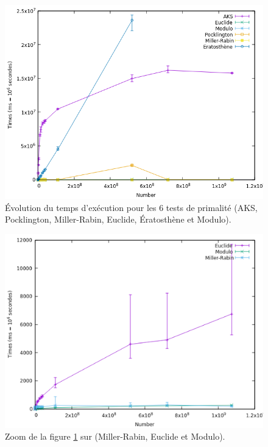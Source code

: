 \begin{frame}
\begin{figure}[!ht]	
		\begin{center}\includegraphics[scale=0.55]{result.png}\end{center}
		\caption{Évolution du temps d'exécution pour les 6 tests de primalité (AKS, Pocklington, Miller-Rabin, Euclide, Ératosthène et Modulo). }
		\label{fg:fig1}
\end{figure}
\end{frame}
		
\begin{frame}
\begin{figure}[!ht]	
		\begin{center}\includegraphics[scale=0.5]{Zoom2.png}\end{center}
		\caption{Zoom de la figure \ref{fg:fig1} sur (Miller-Rabin, Euclide et Modulo).}
		\label{fg:fig3}
\end{figure}
\end{frame}

